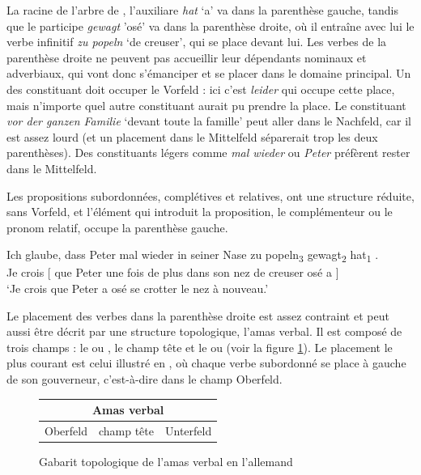 {    La racine de l'arbre de , l'auxiliare \textit{hat} `a' va dans la parenthèse gauche, tandis que le participe \textit{gewagt} 'osé' va dans la parenthèse droite, où il entraîne avec lui le verbe infinitif \textit{zu popeln} `de creuser', qui se place devant lui. Les verbes de la parenthèse droite ne peuvent pas accueillir leur dépendants nominaux et adverbiaux, qui vont donc s'émanciper et se placer dans le domaine principal. Un des constituant doit occuper le Vorfeld : ici c'est \textit{leider} qui occupe cette place, mais n'importe quel autre constituant aurait pu prendre la place.
    Le constituant \textit{vor der ganzen Familie} ‘devant toute la famille’ peut aller dans le Nachfeld, car il est assez lourd (et un placement dans le Mittelfeld séparerait trop les deux parenthèses). Des constituants légers comme \textit{mal wieder} ou \textit{Peter} préfèrent rester dans le Mittelfeld.

    Les propositions subordonnées, complétives et relatives, ont une structure réduite, sans Vorfeld, et l’élément qui introduit la proposition, le complémenteur ou le pronom relatif, occupe la parenthèse gauche. 

    \ea\label{ex:glaube}
    \gll  Ich glaube,   {\ob} dass Peter {mal wieder} in seiner Nase zu {popeln\textsubscript{3}} {gewagt\textsubscript{2}} {hat\textsubscript{1}}   {\cb}.\\
    Je crois   [ que  Peter {une fois de plus} dans son nez   de creuser  osé        a   ]\\
    \glt ‘Je crois que Peter a osé se crotter le nez à nouveau.’
    \z
    
    Le placement des verbes dans la parenthèse droite est assez contraint et peut aussi être décrit par une structure topologique, l’amas verbal. Il est composé de trois champs : le  ou , le champ tête et le  ou  (voir la figure \ref{fig:topo-amas-allemand}). Le placement le plus courant est celui illustré en , où chaque verbe subordonné se place à gauche de son gouverneur, c'est-à-dire dans le champ Oberfeld.

    \begin{figure}[H]
    \def\arraystretch{1.5}
    \setlength{\tabcolsep}{4ex}
    \begin{tabular}{|c|c|c|}
    \hline
    \multicolumn{3}{|c|}{\cellcolor{lsDOIGray}Amas verbal}\\
    \hline
    Oberfeld & \cellcolor{lsDOIGray}champ tête & Unterfeld\\
    \hline
    \end{tabular}
    \caption{Gabarit topologique de l'amas verbal en l'allemand\label{fig:topo-amas-allemand}}
    \end{figure}
    
}
